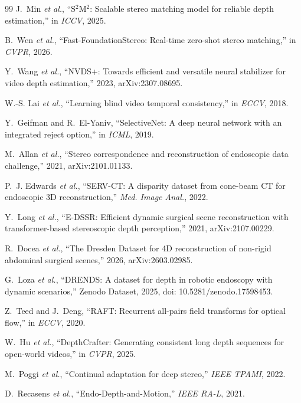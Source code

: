 \documentclass[letterpaper,10pt,conference]{ieeeconf}
\begin{document}
\begin{thebibliography}{99}
J.~Min \emph{et al.}, ``S$^2$M$^2$: Scalable stereo matching model for
reliable depth estimation,'' in \emph{ICCV}, 2025.

B.~Wen \emph{et al.}, ``Fast-FoundationStereo: Real-time zero-shot stereo
matching,'' in \emph{CVPR}, 2026.

Y.~Wang \emph{et al.}, ``NVDS+: Towards efficient and versatile neural
stabilizer for video depth estimation,'' 2023, arXiv:2307.08695.

W.-S. Lai \emph{et al.}, ``Learning blind video temporal consistency,'' in
\emph{ECCV}, 2018.

Y.~Geifman and R.~El-Yaniv, ``SelectiveNet: A deep neural network with an
integrated reject option,'' in \emph{ICML}, 2019.

M.~Allan \emph{et al.}, ``Stereo correspondence and reconstruction of
endoscopic data challenge,'' 2021, arXiv:2101.01133.

P.~J. Edwards \emph{et al.}, ``SERV-CT: A disparity dataset from cone-beam CT
for endoscopic 3D reconstruction,'' \emph{Med. Image Anal.}, 2022.

Y.~Long \emph{et al.}, ``E-DSSR: Efficient dynamic surgical scene
reconstruction with transformer-based stereoscopic depth perception,'' 2021,
arXiv:2107.00229.

R.~Docea \emph{et al.}, ``The Dresden Dataset for 4D reconstruction of
non-rigid abdominal surgical scenes,'' 2026, arXiv:2603.02985.

G.~Loza \emph{et al.}, ``DRENDS: A dataset for depth in robotic endoscopy with
dynamic scenarios,'' Zenodo Dataset, 2025, doi: 10.5281/zenodo.17598453.

Z.~Teed and J.~Deng, ``RAFT: Recurrent all-pairs field transforms for optical
flow,'' in \emph{ECCV}, 2020.

W.~Hu \emph{et al.}, ``DepthCrafter: Generating consistent long depth
sequences for open-world videos,'' in \emph{CVPR}, 2025.

M.~Poggi \emph{et al.}, ``Continual adaptation for deep stereo,'' \emph{IEEE
TPAMI}, 2022.

D.~Recasens \emph{et al.}, ``Endo-Depth-and-Motion,'' \emph{IEEE RA-L}, 2021.

\end{thebibliography}
\end{document}
